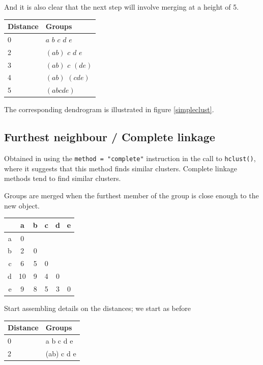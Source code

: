 And it is also clear that the next step will involve merging at a height of 5.

\begin{minipage}[c]{0.5\textwidth}
\begin{tabular}{ll}
Distance & Groups\\
\hline
0 & $a$ $b$ $c$ $d$ $e$\\
2 & $(ab)$ $c$ $d$ $e$\\
3 & $(ab)$ $c$ $(de)$\\
4 & $(ab)$ $(cde)$\\
5 & $(abcde)$
\end{tabular}
\end{minipage}
\begin{minipage}[c]{0.5\textwidth}
\end{minipage}

The corresponding dendrogram is illustrated in figure \ref{simpleclust}.

\subsection{Furthest neighbour / Complete linkage}

Obtained in \R using the \verb+method = "complete"+ instruction in the call to \verb+hclust()+, where it suggests that this method finds similar clusters.   Complete linkage methods tend to find similar clusters. 

Groups are merged when the furthest member of the group is close enough to the new object.

\begin{minipage}[c]{0.5\textwidth}
\begin{tabular}{r|ccccc}
 & a & b & c & d & e\\
\hline
a & 0  &   &   &   &\\
b & 2  & 0 &   &   &\\
c & 6  & 5 & 0 &   & \\
d & 10 & 9 & 4 & 0 &  \\
e & 9  & 8 & 5 & 3 & 0\\
\end{tabular}
\end{minipage}
\begin{minipage}[c]{0.5\textwidth}
Start assembling details on the distances; we start as before
\begin{tabular}{ll}
Distance & Groups\\
\hline
0 & a b c d e\\
2 & (ab) c d e
\end{tabular}
\end{minipage}

